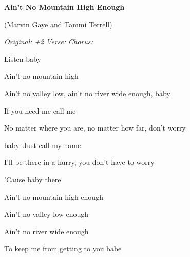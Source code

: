 \begin{song}

%
{\centering
    \huge \textbf{Ain’t No Mountain High Enough}\par
    {\vspace{-0.3em}\Large (Marvin Gaye and Tammi Terrell)}\par
    \vspace{0.75ex}
}

\begin{headerbox}
\RaiseBoxWithChucks
\textit{Original: +2} \quad
\textit{Verse: \Down\Miss\Down\Miss\Down\Up\Down\Up} \quad
\textit{Chorus: \Down\Miss\ChuckDown\Miss \Separator \Down\Up\ChuckDown \Separator
\Up\Miss\Up\ChuckDown \Separator \Up\Miss\Up\ChuckDown\Up}
\end{headerbox}

\begin{vchordbox}
\end{vchordbox}

\large

\bigskip

\Intro {}    Listen baby \par

\bigskip

 Ain't no mountain high \par
Ain't no valley low, ain't no river wide enough, baby \par
{} If you need me call me \par
No matter where you are, no matter how far, don't worry \par
{}baby. Just call my name \par
I'll be there in a hurry, you don't have to worry \par
'Cause baby there \par

\bigskip

\begin{chorusbox}{\Chorus}
Ain't no mountain high enough \par
{}Ain't no valley low enough \par
{}Ain't no river wide enough \par
To keep me from getting to you babe \par
\end{chorusbox}


\end{song}
